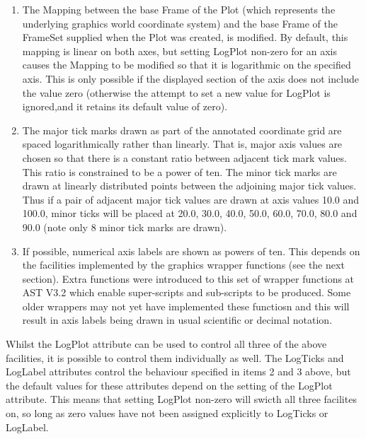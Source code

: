 \documentclass[twoside,11pt]{article}
\begin{document}
\begin{enumerate}

\item The Mapping between the base Frame of the Plot (which represents 
the underlying graphics world coordinate system) and the base Frame of
the FrameSet supplied when the Plot was created, is modified. By
default, this mapping is linear on both axes, but setting LogPlot non-zero
for an axis causes the Mapping to be modified so that it is logarithmic
on the specified axis. This is only possible if the displayed section of
the axis does not include the value zero (otherwise the attempt to set
a new value for LogPlot is ignored,and it retains its default value of
zero).

\item The major tick marks drawn as part of the annotated coordinate grid
are spaced logarithmically rather than linearly. That is, major axis
values are chosen so that there is a constant ratio between adjacent
tick mark values. This ratio is constrained to be a power of ten. The
minor tick marks are drawn at linearly distributed points between the 
adjoining major tick values. Thus if a pair of adjacent major tick values 
are drawn at axis values 10.0 and 100.0, minor ticks will be placed at 
20.0, 30.0, 40.0, 50.0, 60.0, 70.0, 80.0 and 90.0 (note only 8 minor tick
marks are drawn).

\item If possible, numerical axis labels are shown as powers of ten.
This depends on the facilities implemented by the graphics wrapper
functions (see the next section). Extra functions were introduced to this
set of wrapper functions at AST V3.2 which enable super-scripts and 
sub-scripts to be produced. Some older wrappers may not yet have
implemented these functiosn and this will result in axis labels being
drawn in usual scientific or decimal notation.

\end{enumerate}

Whilst the LogPlot attribute can be used to control all three of the above 
facilities, it is possible to control them individually as well. The
LogTicks and LogLabel attributes control the behaviour specified in items
2 and 3 above, but the default values for these attributes depend on the
setting of the LogPlot attribute. This means that setting LogPlot 
non-zero will swicth all three facilites on, so long as zero values have
not been assigned explicitly to LogTicks or LogLabel.
\end{document}

